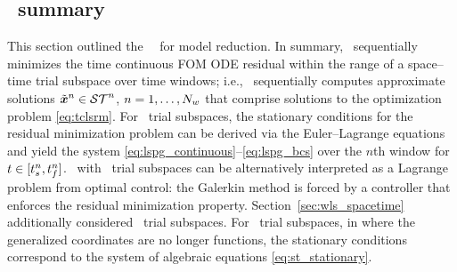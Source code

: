 



\subsection{\methodAcronym\ summary}
This section outlined the \methodAcronym\ \approachKwd\ for model reduction. In
summary, \methodAcronym\ sequentially minimizes the time continuous FOM ODE
residual within the range of a space--time trial subspace over time
windows; i.e.,  
\methodAcronym\ sequentially computes approximate solutions
$\tilde{\boldsymbol x}^{n}\in\mathcal{ ST }^n$, $n=1,\ldots,N_w$ that comprise
solutions to the optimization problem \eqref{eq:tclsrm}.
For \spatialAcronym\ trial subspaces, the stationary conditions for the
residual minimization problem can be derived via the Euler--Lagrange equations
and yield the system \eqref{eq:lspg_continuous}--\eqref{eq:lspg_bcs} over the $n$th window for $t \in
[t_s^{n},t_f^{n}]$.
\methodAcronym\ with \spatialAcronym\ trial subspaces can be alternatively interpreted as a Lagrange problem from optimal control: the Galerkin method is forced by a 
controller that enforces the residual minimization property. 
Section~\ref{sec:wls_spacetime} additionally considered \spaceTimeAcronym\
trial subspaces. For \spaceTimeAcronym\ trial subspaces, in where the
generalized coordinates are no longer functions, the stationary conditions
correspond to the system of algebraic equations \eqref{eq:st_stationary}.

